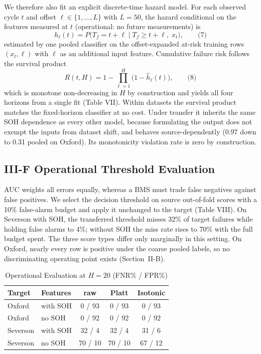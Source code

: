 \documentclass[conference]{IEEEtran}
\begin{document}
We therefore also fit an explicit discrete-time hazard model. For each
observed cycle $t$ and offset $\ell \in \{1,\ldots,L\}$ with $L=50$,
the hazard conditional on the features measured at $t$ (operational: no
future measurements) is
\begin{equation}
h_\ell(t) = P\bigl(T_f = t+\ell \mid T_f \ge t+\ell,\; x_t\bigr),
\qquad \text{(7)}
\end{equation}
estimated by one pooled classifier on the offset-expanded at-risk
training rows $(x_t, \ell)$ with $\ell$ as an additional input
feature. Cumulative failure risk follows the survival product
\begin{equation}
R(t, H) = 1 - \prod_{\ell=1}^{H} \bigl(1 - \hat h_\ell(t)\bigr),
\qquad \text{(8)}
\end{equation}
which is monotone non-decreasing in $H$ by construction and yields all
four horizons from a single fit (Table VII). Within datasets the survival product matches
the fixed-horizon classifier at no cost. Under transfer it inherits the
same SOH dependence as every other model, because formulating the
output does not exempt the inputs from dataset shift, and behaves
source-dependently (0.97 down to 0.31 pooled on Oxford). Its
monotonicity violation rate is zero by construction.

\subsection{III-F Operational Threshold Evaluation}
AUC weights all errors equally, whereas a BMS must trade false
negatives against false positives. We select the decision
threshold on source out-of-fold scores with a 10\% false-alarm budget
and apply it unchanged to the target (Table VIII).
On Severson with SOH, the transferred threshold misses 32\% of target
failures while holding false alarms to 4\%; without SOH the miss rate
rises to 70\% with the full budget spent. The three score types differ
only marginally in this setting. On Oxford, nearly every row is
positive under the coarse pooled labels, so no discriminating
operating point exists (Section~II-B).

\begin{table}[!t]
\caption{Operational Evaluation at $H{=}20$ (FNR\% / FPR\%)}
\label{tab:operational}
\centering
\begin{tabular}{|l|l|c|c|c|}
\hline
\textbf{Target} & \textbf{Features} & \textbf{raw} & \textbf{Platt} & \textbf{Isotonic}\\
\hline
Oxford & with SOH & 0 / 93 & 0 / 93 & 0 / 93 \\ \hline
Oxford & no SOH & 0 / 92 & 0 / 92 & 0 / 92 \\ \hline
Severson & with SOH & 32 / 4 & 32 / 4 & 31 / 6 \\ \hline
Severson & no SOH & 70 / 10 & 70 / 10 & 67 / 12 \\ \hline
\end{tabular}
\end{table}
\end{document}

